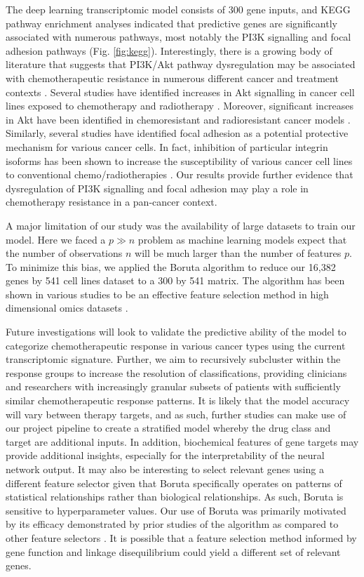 \documentclass[10pt, letterpaper, twocolumn]{article}
\begin{document}
The deep learning transcriptomic model consists of 300 gene inputs, and KEGG pathway enrichment analyses indicated that predictive genes are significantly associated with numerous pathways, most notably the PI3K signalling and focal adhesion pathways (Fig. \ref{fig:kegg}). Interestingly, there is a growing body of literature that suggests that PI3K/Akt pathway dysregulation may be associated with chemotherapeutic resistance in numerous different cancer and treatment contexts \cite{huang_2009}. Several studies have identified increases in Akt signalling in cancer cell lines exposed to chemotherapy and radiotherapy \cite{mapk, wort, phos}. Moreover, significant increases in Akt have been identified in chemoresistant and radioresistant cancer models \cite{cholangio}. Similarly, several studies have identified focal adhesion as a potential protective mechanism for various cancer cells. In fact, inhibition of particular integrin isoforms has been shown to increase the susceptibility of various cancer cell lines to conventional chemo/radiotherapies \cite{focal_adhesion}. Our results provide further evidence that dysregulation of PI3K signalling and focal adhesion may play a role in chemotherapy resistance in a pan-cancer context.

A major limitation of our study was the availability of large datasets to train our model. Here we faced a $p \gg n$ problem as machine learning models expect that the number of observations $n$ will be much larger than the number of features $p$. To minimize this bias, we applied the Boruta algorithm to reduce our 16,382 genes by 541 cell lines dataset to a 300 by 541 matrix. The algorithm has been shown in various studies to be an effective feature selection method in high dimensional omics datasets \cite{boruta}.

Future investigations will look to validate the predictive ability of the model to categorize chemotherapeutic response in various cancer types using the current transcriptomic signature. Further, we aim to recursively subcluster within the response groups to increase the resolution of classifications, providing clinicians and researchers with increasingly granular subsets of patients with sufficiently similar chemotherapeutic response patterns. It is likely that the model accuracy will vary between therapy targets, and as such, further studies can make use of our project pipeline to create a stratified model whereby the drug class and target are additional inputs. In addition, biochemical features of gene targets may provide additional insights, especially for the interpretability of the neural network output. It may also be interesting to select relevant genes using a different feature selector given that Boruta specifically operates on patterns of statistical relationships rather than biological relationships. As such, Boruta is sensitive to hyperparameter values. Our use of Boruta was primarily motivated by its efficacy demonstrated by prior studies of the algorithm as compared to other feature selectors \cite{boruta, deep_cell}. It is possible that a feature selection method informed by gene function and linkage disequilibrium could yield a different set of relevant genes.
\end{document}
